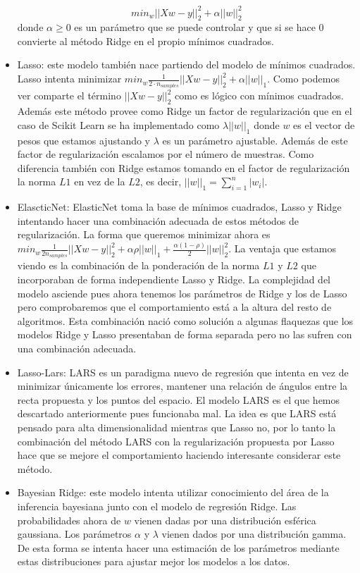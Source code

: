 \documentclass[12pt,a4paper]{article}
\begin{document}
\begin{itemize}
	$$min_w || Xw-y ||_2^2 + \alpha ||w||_2^2$$ donde $\alpha\geq 0$ es un parámetro que se puede controlar y que si se hace 0 convierte al método Ridge en el propio mínimos cuadrados.
	\item Lasso: este modelo también nace partiendo del modelo de mínimos cuadrados. Lasso intenta minimizar $min_w \frac{1}{2\cdot n_{samples}}||Xw-y||_2^2 + \alpha ||w||_1$. Como podemos ver comparte el término $||Xw-y||_2^2$ como es lógico con mínimos cuadrados. Además este método provee como Ridge un factor de regularización que en el caso de Scikit Learn se ha implementado como $\lambda ||w||_1$ donde $w$ es el vector de pesos que estamos ajustando y $\lambda$ es un parámetro ajustable. Además de este factor de regularización escalamos por el número de muestras. Como diferencia también con Ridge estamos tomando en el factor de regularización la norma $L1$ en vez de la $L2$, es decir, $||w||_1 = \sum_{i=1}^{n}|w_i|$. 
	\item ElascticNet: ElasticNet toma la base de mínimos cuadrados, Lasso y Ridge intentando hacer una combinación adecuada de estos métodos de regularización. La forma que queremos minimizar ahora es $min_w \frac{1}{2n_{samples}}|| Xw-y ||_2^2 + \alpha \rho ||w||_1 + \frac{\alpha (1-\rho)}{2}||w||_2^2$. La ventaja que estamos viendo es la combinación de la ponderación de la norma $L1$ y $L2$ que incorporaban de forma independiente Lasso y Ridge. La complejidad del modelo asciende pues ahora tenemos los parámetros de Ridge y los de Lasso pero comprobaremos que el comportamiento está a la altura del resto de algoritmos. Esta combinación nació como solución a algunas flaquezas que los modelos Ridge y Lasso presentaban de forma separada pero no las sufren con una combinación adecuada.
	\item Lasso-Lars: LARS es un paradigma nuevo de regresión que intenta en vez de minimizar únicamente los errores, mantener una relación de ángulos entre la recta propuesta y los puntos del espacio. El modelo LARS es el que hemos descartado anteriormente pues funcionaba mal. La idea es que LARS está pensado para alta dimensionalidad mientras que Lasso no, por lo tanto la combinación del método LARS con la regularización propuesta por Lasso hace que se mejore el comportamiento haciendo interesante considerar este método.
	\item Bayesian Ridge: este modelo intenta utilizar conocimiento del área de la inferencia bayesiana junto con el modelo de regresión Ridge. Las probabilidades ahora de $w$ vienen dadas por una distribución esférica gaussiana. Los parámetros $\alpha$ y $\lambda$ vienen dados por una distribución gamma. De esta forma se intenta hacer una estimación de los parámetros mediante estas distribuciones para ajustar mejor los modelos a los datos.
\end{itemize}
\end{document}
